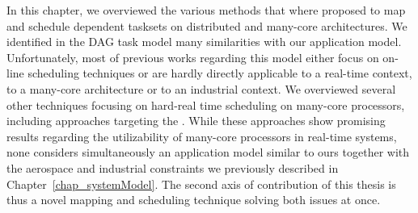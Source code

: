 \documentclass[main.tex]{subfiles}
\begin{document}
In this chapter, we overviewed the various methods that where proposed to map
and schedule dependent tasksets on distributed and many-core architectures. We
identified in the DAG task model many similarities with our application model.
Unfortunately, most of previous works regarding this model either focus on
on-line scheduling techniques or are hardly directly applicable to a real-time
context, to a many-core architecture or to an industrial context. We overviewed
several other techniques focusing on hard-real time scheduling on many-core
processors, including approaches targeting the \mppalong. While these
approaches show promising results regarding the utilizability of many-core
processors in real-time systems, none considers simultaneously an application
model similar to ours together with the aerospace and industrial constraints we
previously described in Chapter~\ref{chap_systemModel}. The second axis of
contribution of this thesis is thus a novel mapping and scheduling technique
solving both issues at once.

\clearpage
\subbiblio
\end{document}

